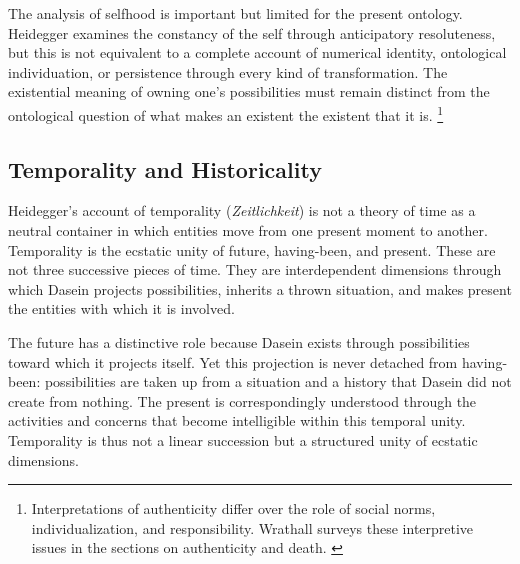 \label{para:VS.B01.P01.C08.S11.SS09.P004}

The analysis of selfhood is important but limited
for the present ontology. Heidegger examines the
constancy of the self through anticipatory resoluteness,
but this is not equivalent to a complete account
of numerical identity, ontological individuation,
or persistence through every kind of transformation.
The existential meaning of owning one's possibilities
must remain distinct from the ontological question
of what makes an existent the existent that it is.
\footnote{Interpretations of authenticity differ over
the role of social norms, individualization, and
responsibility. Wrathall surveys these interpretive
issues in the sections on authenticity and death.
\cite{WrathallHeideggerSEP2025}}



\subsection{Temporality and Historicality}
\label{subsec:ch08-heidegger-temporality}

\label{para:VS.B01.P01.C08.S11.SS10.P001}

Heidegger's account of temporality
(\textit{Zeitlichkeit}) is not a theory of time as
a neutral container in which entities move from
one present moment to another. Temporality is the
ecstatic unity of future, having-been, and present.
These are not three successive pieces of time.
They are interdependent dimensions through which
Dasein projects possibilities, inherits a thrown
situation, and makes present the entities with
which it is involved.
\cite[§§65--71]{HeideggerBeingTime}

\label{para:VS.B01.P01.C08.S11.SS10.P002}

The future has a distinctive role because Dasein
exists through possibilities toward which it
projects itself. Yet this projection is never
detached from having-been: possibilities are
taken up from a situation and a history that
Dasein did not create from nothing. The present
is correspondingly understood through the
activities and concerns that become intelligible
within this temporal unity. Temporality is thus
not a linear succession but a structured unity
of ecstatic dimensions.


